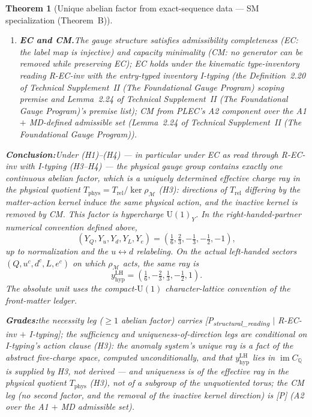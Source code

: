 \documentclass[11pt]{article}
\newtheorem{theorem}{Theorem}[section]
\theoremstyle{definition}
\newcommand{\U}{\mathrm{U}}
\newcommand{\TSII}{Technical Supplement~II (\emph{The Foundational Gauge Program})}
\begin{document}
\begin{theorem}[Unique abelian factor from exact-sequence data ---
SM specialization (Theorem~B)]
\begin{enumerate}[label=(H\arabic*),nosep]
  Let $\rho_{\mathcal M}$ be the matter representation defined by
  $C$ and
  \[
    T_{\mathrm{phys}}:=T_{\mathrm{rel}}/\ker\rho_{\mathcal M}.
  \]
  Cocharacters differing by the kernel induce the same charge vector,
  so the closure's uniqueness statement concerns an effective ray in
  $T_{\mathrm{phys}}$, not a distinguished subgroup of the
  unquotiented torus.  CM removes any inactive kernel direction.
  \item \textbf{EC and CM.}\quad The gauge structure satisfies
  admissibility completeness (EC: the label map is injective) and
  capacity minimality (CM: no generator can be removed while
  preserving EC); EC holds under the kinematic type-inventory reading
  R-EC-inv with the entry-typed inventory I-typing (the
  Definition~2.20 of \TSII{} scoping premise and
  Lemma~2.24 of \TSII{}'s premise list); CM from PLEC's A2
  component over the A1 $+$ MD-defined admissible set
  (Lemma~2.24 of \TSII{}).
\end{enumerate}

\smallskip\noindent\textbf{Conclusion:}\quad Under (H1)--(H4) --- in
particular under EC as read through R-EC-inv with I-typing (H3--H4)
--- the physical gauge group
contains exactly one continuous abelian factor, which is a uniquely
determined \emph{effective charge ray in the physical quotient}
$T_{\mathrm{phys}} = T_{\mathrm{rel}} / \ker\rho_{\mathcal{M}}$
(H3): directions of $T_{\mathrm{rel}}$ differing by the matter-action
kernel induce the same physical action, and the inactive kernel is
removed by CM.  This factor is hypercharge $\U(1)_Y$.  In the
right-handed-partner numerical convention defined above,
\[
  (Y_Q,Y_u,Y_d,Y_L,Y_e)
  =\left(\tfrac16,\tfrac23,-\tfrac13,-\tfrac12,-1\right),
\]
up to normalization and the $u\leftrightarrow d$ relabeling.  On the
actual left-handed sectors $(Q,u^c,d^c,L,e^c)$ on which
$\rho_{\mathcal M}$ acts, the same ray is
\[
  y_{\mathrm{hyp}}^{\mathrm{LH}}
  =\left(\tfrac16,-\tfrac23,\tfrac13,-\tfrac12,1\right).
\]
The absolute unit uses the compact-$\U(1)$ character-lattice convention
of the front-matter ledger.

\smallskip\noindent\textbf{Grades:}\quad the necessity leg ($\ge 1$
abelian factor) carries
[P\textsubscript{structural\_reading} $\mid$ R-EC-inv $+$ I-typing];
the sufficiency and uniqueness-of-direction legs are conditional on
I-typing's action clause (H3): the anomaly system's unique ray is a
fact of the abstract five-charge space, computed unconditionally, and
that $y_{\mathrm{hyp}}^{\mathrm{LH}}$ lies in
$\operatorname{im}C_{\mathbb Q}$ is supplied by H3, not derived ---
and uniqueness is of the effective
ray in the physical quotient $T_{\mathrm{phys}}$ (H3), not of a
subgroup of the unquotiented torus; the CM leg (no second factor,
and the removal of the inactive kernel direction) is [P]
(A2 over the A1 $+$ MD admissible set).
\end{theorem}
\end{document}
